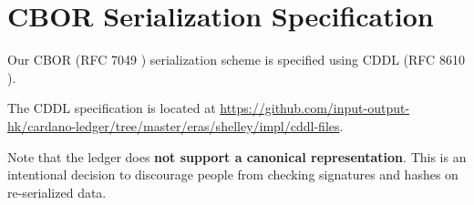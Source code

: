 \section{CBOR Serialization Specification}
\label{sec:cddl}

Our CBOR (RFC 7049 \cite{rfcCBOR})
serialization scheme is specified using
CDDL (RFC 8610 \cite{rfcCDDL}).

The CDDL specification is located at
\url{https://github.com/input-output-hk/cardano-ledger/tree/master/eras/shelley/impl/cddl-files}.

% 

Note that the ledger does
\textbf{not support a canonical representation}.
This is an intentional decision to discourage people from
checking signatures and hashes on re-serialized data.
